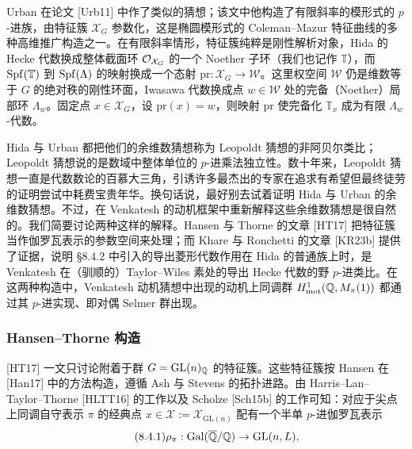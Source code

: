 Urban 在论文 [Urb11] 中作了类似的猜想；该文中他构造了有限斜率的模形式的 $p$-进族，由特征簇 $\mathcal X_G$ 参数化，这是椭圆模形式的 Coleman--Mazur 特征曲线的多种高维推广构造之一。在有限斜率情形，特征簇纯粹是刚性解析对象，Hida 的 Hecke 代数换成整体截面环 $\mathcal{O}_{\mathcal X_G}$ 的一个 Noether 子环（我们也记作 $\mathbb T$），而 $\operatorname{Spf}(\mathbb T)$ 到 $\operatorname{Spf}(\Lambda)$ 的映射换成一个态射 $\mathrm{pr}:\mathcal X_G\to\mathcal W$。这里权空间 $\mathcal W$ 仍是维数等于 $G$ 的绝对秩的刚性环面，Iwasawa 代数换成点 $w\in\mathcal W$ 处的完备（Noether）局部环 $\Lambda_w$。固定点 $x\in\mathcal X_G$，设 $\mathrm{pr}(x)=w$，则映射 $\mathrm{pr}$ 使完备化 $\mathbb T_x$ 成为有限 $\Lambda_w$-代数。

Hida 与 Urban 都把他们的余维数猜想称为 Leopoldt 猜想的非阿贝尔类比；Leopoldt 猜想说的是数域中整体单位的 $p$-进乘法独立性。数十年来，Leopoldt 猜想一直是代数数论的百慕大三角，引诱许多最杰出的专家在追求有希望但最终徒劳的证明尝试中耗费宝贵年华。换句话说，最好别去试着证明 Hida 与 Urban 的余维数猜想。不过，在 Venkatesh 的动机框架中重新解释这些余维数猜想是很自然的。我们简要讨论两种这样的解释。Hansen 与 Thorne 的文章 [HT17] 把特征簇当作伽罗瓦表示的参数空间来处理；而 Khare 与 Ronchetti 的文章 [KR23b] 提供了证据，说明 §8.4.2 中引入的导出菱形代数作用在 Hida 的普通族上时，是 Venkatesh 在（驯顺的）Taylor--Wiles 素处的导出 Hecke 代数的野 $p$-进类比。在这两种构造中，Venkatesh 动机猜想中出现的动机上同调群 $H^1_{\mathrm{mot}}(\mathbb{Q},M_\pi(1))$ 都通过其 $p$-进实现、即对偶 Selmer 群出现。

\subsubsection{Hansen--Thorne 构造}

[HT17] 一文只讨论附着于群 $G=\mathrm{GL}(n)_{\mathbb{Q}}$ 的特征簇。这些特征簇按 Hansen 在 [Han17] 中的方法构造，遵循 Ash 与 Stevens 的拓扑进路。由 Harris--Lan--Taylor--Thorne [HLTT16] 的工作以及 Scholze [Sch15b] 的工作可知：对应于尖点上同调自守表示 $\pi$ 的经典点 $x\in\mathcal X:=\mathcal X_{\mathrm{GL}(n)}$ 配有一个半单 $p$-进伽罗瓦表示
\begin{equation}\tag{8.4.1}\label{eq:a6-05-12}
\rho_\pi:\operatorname{Gal}(\overline{\mathbb{Q}}/\mathbb{Q})\to\mathrm{GL}(n,L),
\end{equation}
